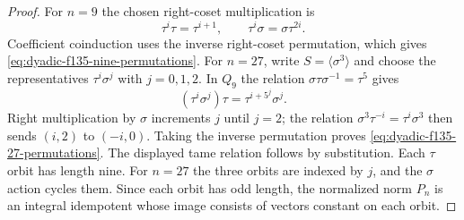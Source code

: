\begin{proof}
For $n=9$ the chosen
right-coset multiplication
is
\[
\tau^i\tau=\tau^{i+1},
\qquad
\tau^i\sigma=\sigma\tau^{2i}.
\]
Coefficient coinduction
uses the inverse
right-coset permutation,
which gives
\eqref{eq:dyadic-f135-nine-permutations}.
For $n=27$, write
$S=\langle\sigma^3\rangle$
and choose the representatives
$\tau^i\sigma^j$ with
$j=0,1,2$.
In $Q_9$ the relation
$\sigma\tau\sigma^{-1}
=\tau^5$ gives
\[
(\tau^i\sigma^j)\tau
 =\tau^{i+5^j}\sigma^j.
\]
Right multiplication
by $\sigma$ increments
$j$ until $j=2$;
the relation
$\sigma^3\tau^{-i}
=\tau^i\sigma^3$
then sends
$(i,2)$ to
$(-i,0)$.
Taking the inverse
permutation proves
\eqref{eq:dyadic-f135-27-permutations}.
The displayed
tame relation follows
by substitution.
Each $\tau$ orbit
has length nine.
For $n=27$
the three orbits
are indexed by $j$,
and the $\sigma$
action cycles them.
Since each orbit
has odd length,
the normalized norm
$P_n$ is an
integral idempotent
whose image consists
of vectors constant
on each orbit.
\end{proof}

